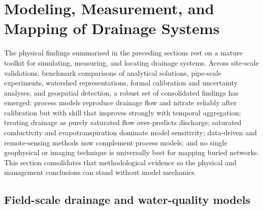 \documentclass[11pt]{article}
\begin{document}
\section*{Modeling, Measurement, and Mapping of Drainage Systems}

The physical findings summarised in the preceding sections rest on a mature
toolkit for simulating, measuring, and locating drainage systems. Across
site-scale validations, benchmark comparisons of analytical solutions,
pipe-scale experiments, watershed representations, formal calibration and
uncertainty analyses, and geospatial detection, a robust set of consolidated
findings has emerged: process models reproduce drainage flow and nitrate
reliably after calibration but with skill that improves strongly with temporal
aggregation; treating drainage as purely saturated flow over-predicts
discharge; saturated conductivity and evapotranspiration dominate model
sensitivity; data-driven and remote-sensing methods now complement process
models; and no single geophysical or imaging technique is universally best for
mapping buried networks. This section consolidates that methodological
evidence so the physical and management conclusions can stand without model
mechanics.

\subsection{Field-scale drainage and water-quality models}
\end{document}
